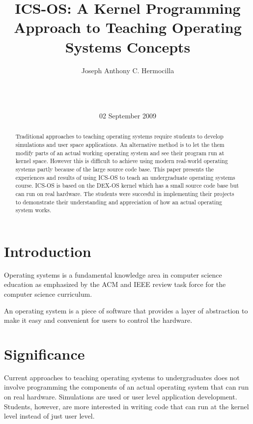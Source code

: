 \documentclass{acm_proc_article-sp}
\begin{document}
\title{ICS-OS: A Kernel Programming Approach to Teaching Operating Systems Concepts}

\author{
\alignauthor
Joseph Anthony C. Hermocilla\\
       \\
       \\
       \\
\alignauthor
}
\date{02 September 2009}

\maketitle
\begin{abstract}
Traditional approaches to teaching operating systems require students to
develop simulations and user space applications. An alternative method
is to let the them modify parts of an actual working operating system
and see their program run at kernel space. However this is difficult to 
achieve using modern real-world operating systems partly because of the large 
source code base. This paper presents the experiences and results of using 
ICS-OS to teach an undergraduate operating systems course. ICS-OS is based on 
the DEX-OS kernel which has a small source code base but can run on real
hardware. The students were succesful in implementing their projects to 
demonstrate their understanding and appreciation of how an actual operating 
system works.
\end{abstract}


\section{Introduction}
Operating systems is a fundamental knowledge area in computer science education
as emphasized by the ACM and IEEE review task force for the computer science 
curriculum. 

An operating system is a piece of software that provides a layer 
of abstraction to make it easy and convenient for users to control the hardware.

\section{Significance}
Current approaches to teaching operating systems to undergraduates does not
involve programming the components of an actual operating system that can run
on real hardware. Simulations are used or user level application development.
Students, however, are more interested in writing code that can run at the
kernel level instead of just user level. 
\end{document}
